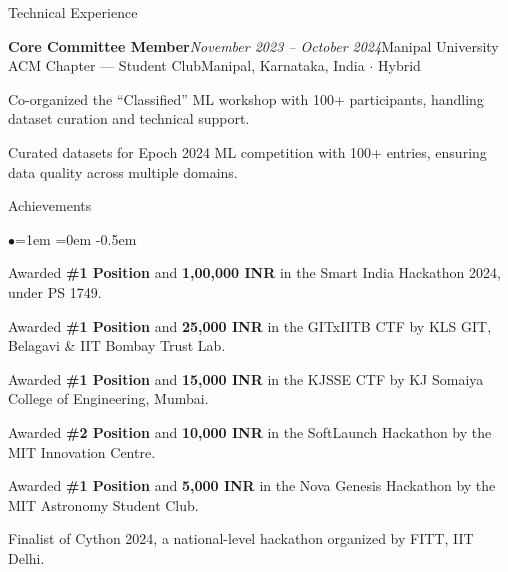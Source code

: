 \documentclass{resume} %
\begin{document}
\begin{rSection}{Technical Experience}
\begin{rSubsection}{\bf Core Committee Member}{\em November 2023 -- October 2024}{Manipal University ACM Chapter --- Student Club}{Manipal, Karnataka, India $\cdot$ Hybrid}
\item Co-organized the ``Classified'' ML workshop with 100+ participants, handling dataset curation and technical support.
\item Curated datasets for Epoch 2024 ML competition with 100+ entries, ensuring data quality across multiple domains.
\end{rSubsection}

\end{rSection}

\begin{rSection}{Achievements}
\begin{list}{$\bullet$}{\leftmargin=1em \itemindent=0em}
\itemsep -0.5em
\item Awarded \textbf{\#1 Position} and \textbf{1,00,000 INR} in the Smart India Hackathon 2024, under PS 1749.
\item Awarded \textbf{\#1 Position} and \textbf{25,000 INR} in the GITxIITB CTF by KLS GIT, Belagavi \& IIT Bombay Trust Lab.
\item Awarded \textbf{\#1 Position} and \textbf{15,000 INR} in the KJSSE CTF by KJ Somaiya College of Engineering, Mumbai.
\item Awarded \textbf{\#2 Position} and \textbf{10,000 INR} in the SoftLaunch Hackathon by the MIT Innovation Centre.
\item Awarded \textbf{\#1 Position} and \textbf{5,000 INR} in the Nova Genesis Hackathon by the MIT Astronomy Student Club.
\item Finalist of Cython 2024, a national-level hackathon organized by FITT, IIT Delhi.
\end{list}
\end{rSection}
\end{document}
